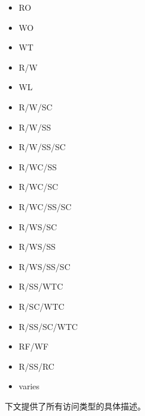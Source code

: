 \begin{multicols}{4}
  \begin{itemize}
    \item RO
    \item WO
    \item WT
    \item R/W
    \item WL
    \item R/W/SC
    \item R/W/SS
    \item R/W/SS/SC
    \item R/WC/SS
    \item R/WC/SC
    \item R/WC/SS/SC
    \item R/WS/SC
    \item R/WS/SS
    \item R/WS/SS/SC
    \item R/SS/WTC
    \item R/SC/WTC
    \item R/SS/SC/WTC
    \item RF/WF
    \item R/SS/RC
    \item varies
  \end{itemize}
\end{multicols}

下文提供了所有访问类型的具体描述。


